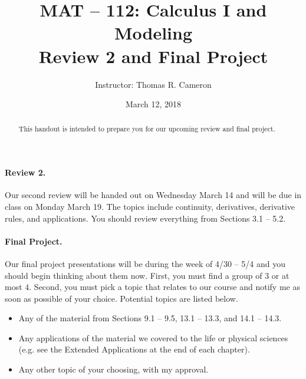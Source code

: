 \documentclass{article}
\title{MAT -- 112: Calculus I and Modeling\\
\large{Review 2 and Final Project}}
\author{Instructor: Thomas R. Cameron}
\date{March 12, 2018}
\begin{document}
\maketitle

\begin{abstract}
 This handout is intended to prepare you for our upcoming review and final project. 
\end{abstract}

\paragraph*{Review 2.} Our second review will be handed out on Wednesday March 14 and will be due in class on Monday March 19. The topics include continuity, derivatives, derivative rules, and applications. You should review everything from Sections 3.1 -- 5.2.

\paragraph*{Final Project.} Our final project presentations will be during the week of 4/30 -- 5/4 and you should begin thinking about them now. First, you must find a group of $3$ or at most $4$. Second, you must pick a topic that relates to our course and notify me as soon as possible of your choice. Potential topics are listed below.
\begin{itemize}
\item	Any of the material from Sections 9.1 -- 9.5, 13.1 -- 13.3, and 14.1 -- 14.3.
\item	Any applications of the material we covered to the life or physical sciences (e.g. see the Extended Applications at the end of each chapter).
\item	Any other topic of your choosing, with my approval. 
\end{itemize}
\end{document}
